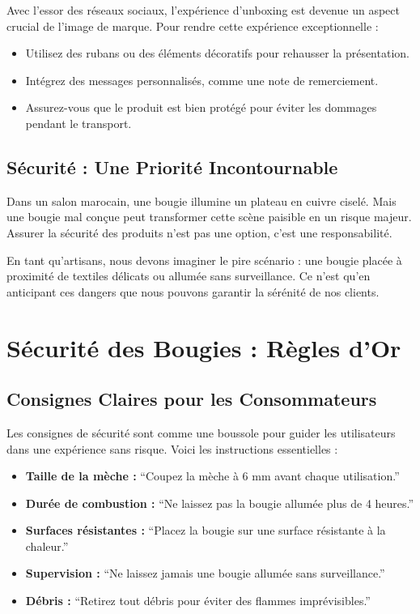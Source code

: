 \documentclass[11pt,fleqn,onecolumn,oneside]{book}
\begin{document}
Avec l’essor des réseaux sociaux, l’expérience d’unboxing est devenue un aspect crucial de l’image de marque. Pour rendre cette expérience exceptionnelle :
\begin{itemize}
    \item Utilisez des rubans ou des éléments décoratifs pour rehausser la présentation.
    \item Intégrez des messages personnalisés, comme une note de remerciement.
    \item Assurez-vous que le produit est bien protégé pour éviter les dommages pendant le transport.
\end{itemize}

\subsection*{Sécurité : Une Priorité Incontournable}

Dans un salon marocain, une bougie illumine un plateau en cuivre ciselé. Mais une bougie mal conçue peut transformer cette scène paisible en un risque majeur. Assurer la sécurité des produits n’est pas une option, c’est une responsabilité.

\begin{example}
En tant qu’artisans, nous devons imaginer le pire scénario : une bougie placée à proximité de textiles délicats ou allumée sans surveillance. Ce n’est qu’en anticipant ces dangers que nous pouvons garantir la sérénité de nos clients.
\end{example}

\section{Sécurité des Bougies : Règles d’Or}

\subsection*{Consignes Claires pour les Consommateurs}

Les consignes de sécurité sont comme une boussole pour guider les utilisateurs dans une expérience sans risque. Voici les instructions essentielles :
\begin{itemize}
    \item \textbf{Taille de la mèche :} ``Coupez la mèche à 6 mm avant chaque utilisation.''
    \item \textbf{Durée de combustion :} ``Ne laissez pas la bougie allumée plus de 4 heures.''
    \item \textbf{Surfaces résistantes :} ``Placez la bougie sur une surface résistante à la chaleur.''
    \item \textbf{Supervision :} ``Ne laissez jamais une bougie allumée sans surveillance.''
    \item \textbf{Débris :} ``Retirez tout débris pour éviter des flammes imprévisibles.''
\end{itemize}
\end{document}
